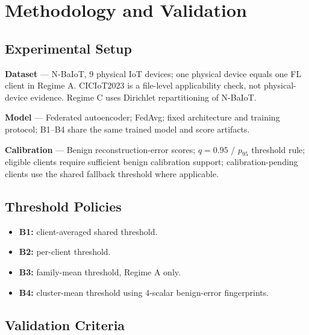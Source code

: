 
\section{Methodology and Validation}

\subsection{Experimental Setup}

\textbf{Dataset} --- N-BaIoT, 9 physical IoT devices; one physical device equals one FL
client in Regime A. CICIoT2023 is a file-level applicability check, not physical-device
evidence. Regime C uses Dirichlet repartitioning of N-BaIoT.

\textbf{Model} --- Federated autoencoder; FedAvg; fixed architecture and training
protocol; B1--B4 share the same trained model and score artifacts.

\textbf{Calibration} --- Benign reconstruction-error scores; $q = 0.95$ / $p_{95}$
threshold rule; eligible clients require sufficient benign calibration support;
calibration-pending clients use the shared fallback threshold where applicable.

\subsection{Threshold Policies}

\begin{itemize}
  \item \textbf{B1:} client-averaged shared threshold.
  \item \textbf{B2:} per-client threshold.
  \item \textbf{B3:} family-mean threshold, Regime A only.
  \item \textbf{B4:} cluster-mean threshold using 4-scalar benign-error fingerprints.
\end{itemize}

\subsection{Validation Criteria}

